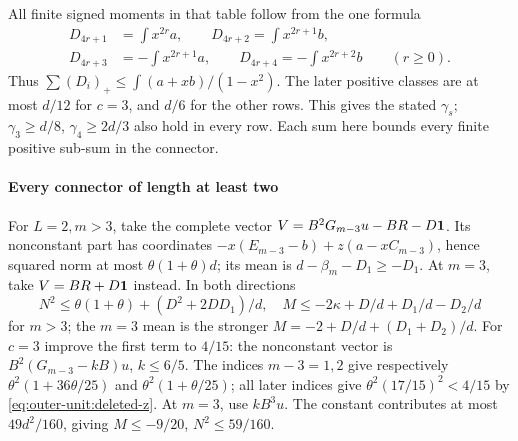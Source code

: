 All finite signed moments in that table follow from the one formula
\begin{equation}\label{eq:outer-unit:residues}
\begin{aligned}
 D_{4r+1}&=\int x^{2r}a,\qquad D_{4r+2}=\int x^{2r+1}b,\\
 D_{4r+3}&=-\int x^{2r+1}a,\qquad D_{4r+4}=-\int x^{2r+2}b
 \qquad(r\ge0).
\end{aligned}
\end{equation}
Thus \(\sum(D_i)_+\le\int(a+xb)/(1-x^2)\).
The later positive classes are at most \(d/12\) for \(c=3\), and
\(d/6\) for the other rows. This gives the stated \(\gamma_s\);
\(\gamma_3\ge d/8\), \(\gamma_4\ge2d/3\) also hold in every row.
Each sum here bounds every finite positive sub-sum in the connector.

\paragraph{Every connector of length at least two}
For \(L=2,m>3\), take the complete vector
\(V=B^2G_{m-3}u-BR-D\mathbf1\).
Its nonconstant part has coordinates
\(-x(E_{m-3}-b)+z(a-xC_{m-3})\), hence squared norm at most
\(\theta(1+\theta)d\); its mean is \(d-\beta_m-D_1\ge-D_1\).
At \(m=3\), take \(V=BR+D\mathbf1\) instead. In both directions
\begin{equation}\label{eq:outer-unit:L2-vector}
 N^2\le\theta(1+\theta)+(D^2+2DD_1)/d,\quad
 M\le-2\kappa+D/d+D_1/d-D_2/d
\end{equation}
for \(m>3\); the \(m=3\) mean is the stronger
\(M=-2+D/d+(D_1+D_2)/d\).
For \(c=3\) improve the first term to \(4/15\): the nonconstant
vector is \(B^2(G_{m-3}-kB)u\), \(k\le6/5\).
The indices \(m-3=1,2\) give respectively
\(\theta^2(1+36\theta/25)\) and \(\theta^2(1+\theta/25)\);
all later indices give \(\theta^2(17/15)^2<4/15\) by
\eqref{eq:outer-unit:deleted-z}. At \(m=3\), use \(kB^3u\).
The constant contributes at most \(49d^2/160\), giving
\(M\le-9/20\), \(N^2\le59/160\).

